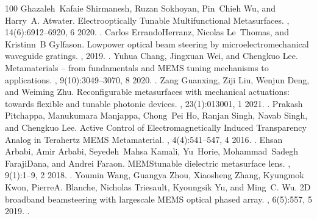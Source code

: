 \documentclass[a4paper,10pt,english,openany,oneside]{jupyterBook}
\begin{document}
\begin{sphinxthebibliography}{100}
\sphinxAtStartPar
Ghazaleh Kafaie Shirmanesh, Ruzan Sokhoyan, Pin Chieh Wu, and Harry A. Atwater. Electro\sphinxhyphen{}optically Tunable Multifunctional Metasurfaces. , 14(6):6912–6920, 6 2020. .
\sphinxAtStartPar
Carlos Errando\sphinxhyphen{}Herranz, Nicolas Le Thomas, and Kristinn B Gylfason. Low\sphinxhyphen{}power optical beam steering by microelectromechanical waveguide gratings. , 2019. .
\sphinxAtStartPar
Yuhua Chang, Jingxuan Wei, and Chengkuo Lee. Metamaterials – from fundamentals and MEMS tuning mechanisms to applications. , 9(10):3049–3070, 8 2020. .
\sphinxAtStartPar
Zang Guanxing, Ziji Liu, Wenjun Deng, and Weiming Zhu. Reconfigurable metasurfaces with mechanical actuations: towards flexible and tunable photonic devices. , 23(1):013001, 1 2021. .
\sphinxAtStartPar
Prakash Pitchappa, Manukumara Manjappa, Chong Pei Ho, Ranjan Singh, Navab Singh, and Chengkuo Lee. Active Control of Electromagnetically Induced Transparency Analog in Terahertz MEMS Metamaterial. , 4(4):541–547, 4 2016. .
\sphinxAtStartPar
Ehsan Arbabi, Amir Arbabi, Seyedeh Mahsa Kamali, Yu Horie, Mohammad Sadegh Faraji\sphinxhyphen{}Dana, and Andrei Faraon. MEMS\sphinxhyphen{}tunable dielectric metasurface lens. , 9(1):1–9, 2 2018. .
\sphinxAtStartPar
Youmin Wang, Guangya Zhou, Xiaosheng Zhang, Kyungmok Kwon, Pierre\sphinxhyphen{}A. Blanche, Nicholas Triesault, Kyoung\sphinxhyphen{}sik Yu, and Ming C. Wu. 2D broadband beamsteering with large\sphinxhyphen{}scale MEMS optical phased array. , 6(5):557, 5 2019. .

\end{sphinxthebibliography}
\end{document}
